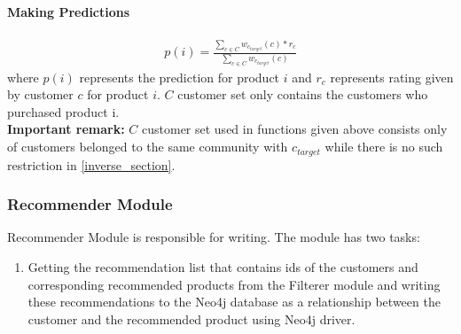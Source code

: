 	\paragraph{Making Predictions}
	\begin{equation*} 
	\begin{split}
	p(i) = \frac{\sum_{c \in C}^{} w_{c_{target}}(c)*r_{c}}{\sum_{c \in C}^{} w_{c_{target}}(c)}
	\end{split}
	\end{equation*}
	where $p(i)$ represents the prediction for product $i$ and $r_{c}$ represents rating given by customer $c$ for product $i$. $C$ customer set only contains the customers who purchased product i. \\
	
	\textbf{Important remark:} $C$ customer set used in functions given above consists only of customers belonged to the same community with $c_{target}$ while there is no such restriction in \ref{inverse_section}.

	\subsubsection{Recommender Module} Recommender Module is responsible for writing. The module has two tasks:
	\begin{enumerate}
		\item Getting the recommendation list that contains ids of the customers and corresponding recommended products from the Filterer module and writing these recommendations to the Neo4j database as a relationship between the customer and the recommended product using Neo4j driver.
	\end{enumerate}